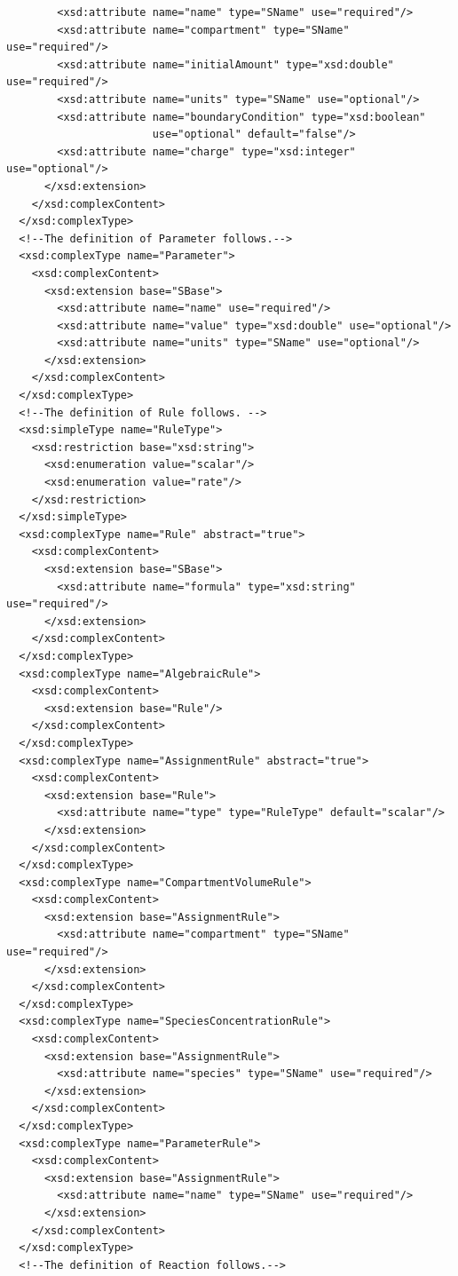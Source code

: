 \documentclass[10pt]{cekarticle}
\newenvironment{blockChanged}{\color{BrickRed}}{}
\begin{document}
\begin{blockChanged}
\begin{small}
\begin{verbatim}
      	<xsd:attribute name="name" type="SName" use="required"/>
      	<xsd:attribute name="compartment" type="SName" use="required"/>
      	<xsd:attribute name="initialAmount" type="xsd:double" use="required"/>
      	<xsd:attribute name="units" type="SName" use="optional"/>
      	<xsd:attribute name="boundaryCondition" type="xsd:boolean"
                       use="optional" default="false"/>
      	<xsd:attribute name="charge" type="xsd:integer" use="optional"/>
      </xsd:extension>
    </xsd:complexContent>
  </xsd:complexType>
  <!--The definition of Parameter follows.-->
  <xsd:complexType name="Parameter">
    <xsd:complexContent>
      <xsd:extension base="SBase">
      	<xsd:attribute name="name" use="required"/>
      	<xsd:attribute name="value" type="xsd:double" use="optional"/>
      	<xsd:attribute name="units" type="SName" use="optional"/>
      </xsd:extension>
    </xsd:complexContent>
  </xsd:complexType>
  <!--The definition of Rule follows. -->
  <xsd:simpleType name="RuleType">
    <xsd:restriction base="xsd:string">
      <xsd:enumeration value="scalar"/>
      <xsd:enumeration value="rate"/>
    </xsd:restriction>
  </xsd:simpleType>
  <xsd:complexType name="Rule" abstract="true">
    <xsd:complexContent>
      <xsd:extension base="SBase">
      	<xsd:attribute name="formula" type="xsd:string" use="required"/>
      </xsd:extension>
    </xsd:complexContent>
  </xsd:complexType>
  <xsd:complexType name="AlgebraicRule">
    <xsd:complexContent>
      <xsd:extension base="Rule"/>
    </xsd:complexContent>
  </xsd:complexType>
  <xsd:complexType name="AssignmentRule" abstract="true">
    <xsd:complexContent>
      <xsd:extension base="Rule">
      	<xsd:attribute name="type" type="RuleType" default="scalar"/>
      </xsd:extension>
    </xsd:complexContent>
  </xsd:complexType>
  <xsd:complexType name="CompartmentVolumeRule">
    <xsd:complexContent>
      <xsd:extension base="AssignmentRule">
      	<xsd:attribute name="compartment" type="SName" use="required"/>
      </xsd:extension>
    </xsd:complexContent>
  </xsd:complexType>
  <xsd:complexType name="SpeciesConcentrationRule">
    <xsd:complexContent>
      <xsd:extension base="AssignmentRule">
      	<xsd:attribute name="species" type="SName" use="required"/>
      </xsd:extension>
    </xsd:complexContent>
  </xsd:complexType>
  <xsd:complexType name="ParameterRule">
    <xsd:complexContent>
      <xsd:extension base="AssignmentRule">
      	<xsd:attribute name="name" type="SName" use="required"/>
      </xsd:extension>
    </xsd:complexContent>
  </xsd:complexType>
  <!--The definition of Reaction follows.-->

\end{verbatim}
\end{small}
\end{blockChanged}
\end{document}

